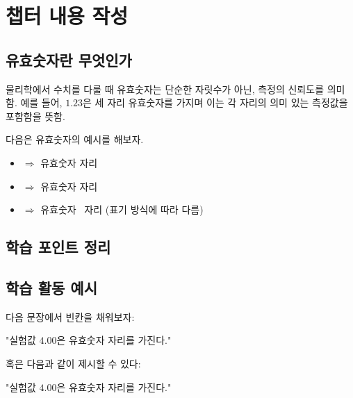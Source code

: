 \chapter{챕터 내용 작성}

\section{유효숫자란 무엇인가}

물리학에서 수치를 다룰 때 유효숫자는 단순한 자릿수가 아닌, 측정의 신뢰도를 의미함. 예를 들어, $1.23$은 세 자리 유효숫자를 가지며 이는 각 자리의 의미 있는 측정값을 포함함을 뜻함.  

다음은 유효숫자의 예시를 해보자.

\begin{itemize}
  \item {} $\Rightarrow$ 유효숫자 자리
  \item {} $\Rightarrow$ 유효숫자 자리
  \item {} $\Rightarrow$ 유효숫자 ~자리 (표기 방식에 따라 다름)
\end{itemize}

\section{학습 포인트 정리}


\section{학습 활동 예시}

다음 문장에서 빈칸을 채워보자:

"실험값 $4.00$은 유효숫자 자리를 가진다."

혹은 다음과 같이 제시할 수 있다:

"실험값 $4.00$은 유효숫자 \seolf{   }자리를 가진다."


\clearpage
